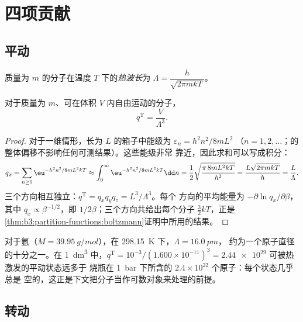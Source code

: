\section{四项贡献}

\subsection*{平动}

\begin{definition}[热波长]\label{def:b3:partition-functions:thermal-wavelength}
质量为 $m$ 的分子在温度 $T$ 下的\emph{热波长}为
$\Lambda = \dfrac{h}{\sqrt{2\pi mkT}}$。
\end{definition}

\begin{proposition}[平动配分函数]\label{prop:b3:partition-functions:q-trans}
对于质量为 $m$、可在体积 $V$ 内自由运动的分子，
\[
  q^{\mathrm T} = \frac{V}{\Lambda^3}.
\]
\end{proposition}

\begin{proof}
对于一维情形，长为 $L$ 的箱子中能级为 $\varepsilon_n = h^2n^2/8mL^2$
（$n = 1, 2, \dots$；的整体偏移不影响任何可测结果）。这些能级非常
靠近，因此求和可以写成积分：
\[
  q_x = \sum_{n\ge1}\eu^{-h^2n^2/8mL^2kT} \approx \int_0^\infty\eu^{-h^2n^2/8mL^2kT}\dd n
      = \frac12\sqrt{\frac{\pi\,8mL^2kT}{h^2}} = \frac{L\sqrt{2\pi mkT}}{h} = \frac{L}{\Lambda}.
\]
三个方向相互独立：$q^{\mathrm T} = q_xq_yq_z = L^3/\Lambda^3$。每个
方向的平均能量为 $-\partial\ln q_x/\partial\beta$，其中 $q_x \propto \beta^{-1/2}$，即
$1/2\beta$；三个方向共给出每个分子 $\frac32kT$，正是
\cref{thm:b3:partition-functions:boltzmann}证明中所用的结果。
\end{proof}

\begin{example}[烧瓶中的氩]\label{ex:b3:partition-functions:argon}
对于氩（$M = \qty{39.95}{g/mol}$），在 \qty{298.15}{K} 下，$\Lambda = \qty{16.0}{pm}$，
约为一个原子直径的十分之一。在 \qty{1}{dm^3} 中，$q^{\mathrm T} = 10^{-3}/(1.600\times10^{-11})^3 = \num{2.44e29}$
可被热激发的平动状态远多于
烧瓶在 \qty{1}{bar} 下所含的 $2.4\times10^{22}$ 个原子：每个状态几乎总是
空的，这正是下文把分子当作可数对象来处理的前提。
\end{example}

\subsection*{转动}

